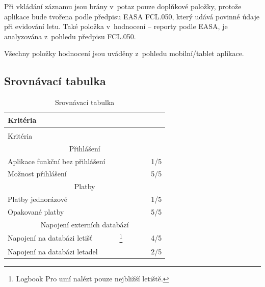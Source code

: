 \documentclass[thesis=M,czech]{FITthesis}[2012/06/26]
\begin{document}
Při vkládání záznamu jsou brány v~potaz pouze doplňkové položky, protože aplikace bude tvořena podle předpisu EASA FCL.050, který udává povinné údaje při evidování letu. Také položka v~hodnocení  -- reporty podle EASA, je analyzována z~pohledu předpisu FCL.050. 

Všechny položky hodnocení jsou uváděny z~pohledu mobilní/tablet aplikace.

\subsection{Srovnávací tabulka}
\newcommand{\OK}{\ding{51}}
\newcommand{\NOK}{\ding{55}}
\newcommand{\rot}{\rotatebox{90}}

{\setlength\extrarowheight{2pt}
\begin{longtable}{@{\extracolsep{\fill}}l c c c c c c}
   \caption[Srovnávací tabulka]{Srovnávací tabulka}\label{tab:srovnavaci_tabulka} \\
   Kritéria & \rot{Log Ten Pro X} & \rot{Logbook Pro} & \rot{Safelog} &
   \rot{FlyLogio} & \rot{Smart Logbook} & \rot{Výsledek} \\
  \endfirsthead
   \caption[Srovnávací tabulka]{Srovnávací tabulka}\label{tab:srovnavaci_tabulka} \\
   Kritéria & \rot{Log Ten Pro X} & \rot{Logbook Pro} & \rot{Safelog} &
   \rot{FlyLogio} & \rot{Smart Logbook} & \rot{Výsledek} \\
  \endhead

   \hline
   \multicolumn{7}{c}{Přihlášení} \\
   \hline
   Aplikace funkční bez přihlášení 			 & \OK & \NOK & \NOK & \NOK & \NOK & 1/5 \\
   Možnost přihlášení								 & \OK & \OK & \OK & \OK & \OK  & 5/5 \\
   
   \hline
   \multicolumn{7}{c}{Platby} \\
   \hline
   Platby jednorázové			 & \NOK & \NOK & \NOK & \NOK & \OK & 1/5 \\
   Opakované platby			 & \OK & \OK & \OK & \OK & \OK  & 5/5 \\
   
   \hline
   \multicolumn{7}{c}{Napojení externích databází} \\
   \hline
   Napojení na databázi letišť		 & \NOK & \OK \footnote{Logbook Pro umí nalézt pouze nejbližší letiště.} & \OK & \OK & \OK & 4/5 \\
   Napojení na databázi letadel	 & \NOK & \NOK & \OK & \OK & \NOK  & 2/5 \\
   

\end{longtable}}
\end{document}
